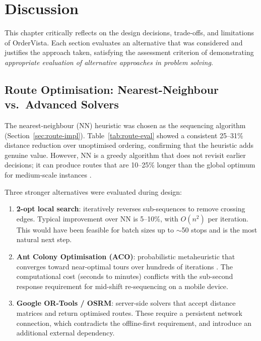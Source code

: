 ﻿%
\chapter{Discussion}
\label{ch:discussion}

This chapter critically reflects on the design decisions, trade-offs, and
limitations of OrderVista.  Each section evaluates an alternative that was
considered and justifies the approach taken, satisfying the assessment
criterion of demonstrating \emph{appropriate evaluation of alternative
approaches in problem solving}.

\section{Route Optimisation: Nearest-Neighbour vs.\ Advanced Solvers}
\label{sec:disc-routing}

The nearest-neighbour (NN) heuristic was chosen as the sequencing algorithm
(Section~\ref{sec:route-impl}).  Table~\ref{tab:route-eval} showed a
consistent 25--31\% distance reduction over unoptimised ordering, confirming
that the heuristic adds genuine value.  However, NN is a greedy algorithm
that does not revisit earlier decisions; it can produce routes that are
10--25\% longer than the global optimum for medium-scale instances
\autocite{laporte2009fifty}.

Three stronger alternatives were evaluated during design:

\begin{enumerate}
  \item \textbf{2-opt local search}: iteratively reverses sub-sequences to
        remove crossing edges.  Typical improvement over NN is 5--10\%, with
        $O(n^{2})$ per iteration.  This would have been feasible for
        batch sizes up to $\sim$50 stops and is the most natural next step.
  \item \textbf{Ant Colony Optimisation (ACO)}: probabilistic
        metaheuristic that converges toward near-optimal tours over hundreds
        of iterations \autocite{dorigo1997ant}.  The computational cost
        (seconds to minutes) conflicts with the sub-second response
        requirement for mid-shift re-sequencing on a mobile device.
  \item \textbf{Google OR-Tools / OSRM}: server-side solvers that accept
        distance matrices and return optimised routes.  These require a
        persistent network connection, which contradicts the offline-first
        requirement, and introduce an additional external dependency.
\end{enumerate}

